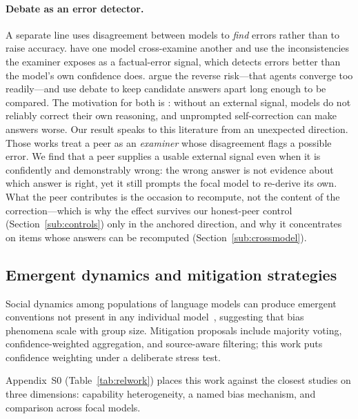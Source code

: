 \documentclass[11pt]{article}
\begin{document}
\paragraph{Debate as an error detector.}
A separate line uses disagreement between models to \emph{find} errors rather
than to raise accuracy.
\citet{cohen2023lmvslm} have one model cross-examine another and use the
inconsistencies the examiner exposes as a factual-error signal, which detects
errors better than the model's own confidence does.
\citet{liang2024encouraging} argue the reverse risk---that agents converge
too readily---and use debate to keep candidate answers apart long enough to
be compared.
The motivation for both is \citet{huang2024selfcorrect}: without an external
signal, models do not reliably correct their own reasoning, and unprompted
self-correction can make answers worse.
Our result speaks to this literature from an unexpected direction.
Those works treat a peer as an \emph{examiner} whose disagreement flags a
possible error.
We find that a peer supplies a usable external signal even when it is
confidently and demonstrably wrong: the wrong answer is not evidence about
which answer is right, yet it still prompts the focal model to re-derive its
own.
What the peer contributes is the occasion to recompute, not the content of
the correction---which is why the effect survives our honest-peer control
(Section~\ref{sub:controls}) only in the anchored direction, and why it
concentrates on items whose answers can be recomputed
(Section~\ref{sub:crossmodel}).

\subsection{Emergent dynamics and mitigation strategies}
\label{sub:emergent}

Social dynamics among populations of language models can produce emergent
conventions not present in any individual model~\citep{ashery2025emergent},
suggesting that bias phenomena scale with group size.
Mitigation proposals include majority voting, confidence-weighted
aggregation, and source-aware filtering; this work puts confidence
weighting under a deliberate stress test.

Appendix~S0 (Table~\ref{tab:relwork}) places this work
against the closest studies on three dimensions: capability heterogeneity, a
named bias mechanism, and comparison across focal models.
\end{document}
